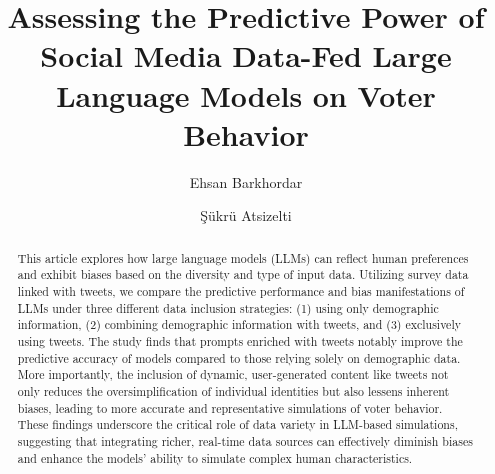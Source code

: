 \documentclass[sigconf,natbib=false]{acmart}
\begin{document}
\title{Assessing the Predictive Power of Social Media Data-Fed Large Language Models on Voter Behavior}


\author{Ehsan Barkhordar}

\author{Şükrü Atsizelti}

\renewcommand{\shortauthors}{Trovato et al.}

\begin{abstract}
This article explores how large language models (LLMs) can reflect human preferences and exhibit biases based on the diversity and type of input data. Utilizing survey data linked with tweets, we compare the predictive performance and bias manifestations of LLMs under three different data inclusion strategies: (1) using only demographic information, (2) combining demographic information with tweets, and (3) exclusively using tweets. The study finds that prompts enriched with tweets notably improve the predictive accuracy of models compared to those relying solely on demographic data. More importantly, the inclusion of dynamic, user-generated content like tweets not only reduces the oversimplification of individual identities but also lessens inherent biases, leading to more accurate and representative simulations of voter behavior. These findings underscore the critical role of data variety in LLM-based simulations, suggesting that integrating richer, real-time data sources can effectively diminish biases and enhance the models' ability to simulate complex human characteristics.
\end{abstract}
\end{document}
